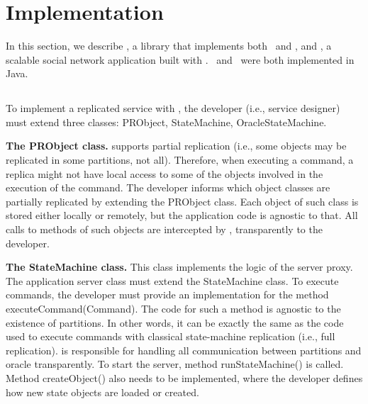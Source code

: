 \section{Implementation}
\label{sec:implementation}

In this section, we describe \libname{}, a library that implements both \ssmr\ and \dssmr{}, and \appname{}, a scalable social network application built with \libname{}. \libname\ and \appname\ were both implemented in Java.

\subsection{\libname}

To implement a replicated service with \libname{}, the developer (i.e., service designer) must extend three classes: PRObject, StateMachine, OracleStateMachine.

\textbf{The PRObject class.} \libname{} supports partial replication (i.e., some objects may be replicated in some partitions, not all). Therefore, when executing a command, a replica might not have local access to some of the objects involved in the execution of the command. The developer informs \libname{} which object classes are partially replicated by extending the PRObject class. Each object of such class is stored either locally or remotely, but the application code is agnostic to that. All calls to methods of such objects are intercepted by \libname{}, transparently to the developer.


\textbf{The StateMachine class.} This class implements the logic of the server proxy. The application server class must extend the StateMachine class. To execute commands, the developer must provide an implementation for the method executeCommand(Command). The code for such a method is agnostic to the existence of partitions. In other words, it can be exactly the same as the code used to execute commands with classical state-machine replication (i.e., full replication). \libname{} is responsible for handling all communication between partitions and oracle transparently. To start the server, method runStateMachine() is called. Method createObject() also needs to be implemented, where the developer defines how new state objects are loaded or created.

